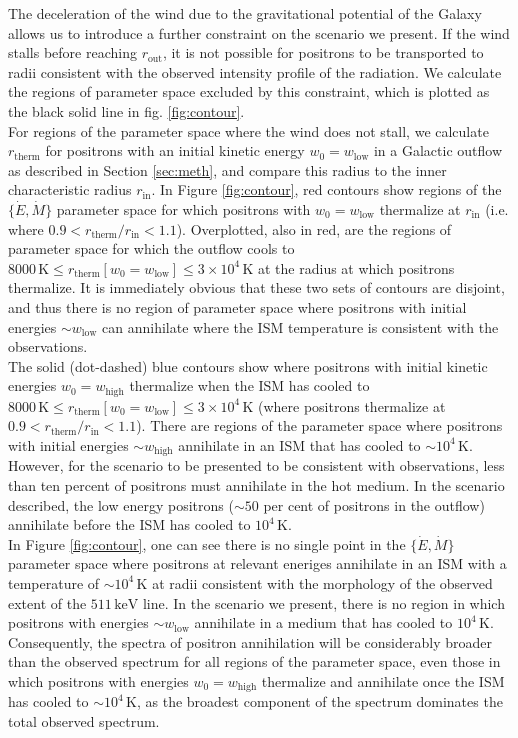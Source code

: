 \documentclass[a4paper,fleqn,usenatbib]{mnras}
\begin{document}
The deceleration of the wind due to the gravitational potential of the Galaxy allows us to introduce a further constraint on the scenario we present. If the wind stalls before reaching $r_\mathrm{out}$, it is not possible for positrons to be transported to radii consistent with the observed intensity profile of the radiation. We calculate the regions of parameter space excluded by this constraint, which is plotted as the black solid line in fig. \ref{fig:contour}.\\
For regions of the parameter space where the wind does not stall, we calculate $r_\mathrm{therm}$ for positrons with an initial kinetic energy $w_0 = w_\mathrm{low}$ in a Galactic outflow as described in Section \ref{sec:meth}, and compare this radius to the inner characteristic radius $r_\mathrm{in}$. In Figure \ref{fig:contour}, red contours show regions of the $\{\dot{E}, \dot{M}\}$ parameter space for which positrons with $w_0 = w_\mathrm{low}$ thermalize at $r_\mathrm{in}$ (i.e. where $0.9<r_\mathrm{therm}/r_\mathrm{in}<1.1$). Overplotted, also in red, are the regions of parameter space for which the outflow cools to $8000\,\mathrm{K}\leq r_\mathrm{therm}[w_0 = w_\mathrm{low}]\leq 3\times10^4\,\mathrm{K}$ at the radius at which positrons thermalize. It is immediately obvious that these two sets of contours are disjoint, and thus there is no region of parameter space where positrons with initial energies $\sim w_\mathrm{low}$ can annihilate where the ISM temperature is consistent with the observations.\\
The solid (dot-dashed) blue contours show where positrons with initial kinetic energies $w_0 = w_\mathrm{high}$ thermalize when the ISM has cooled to $8000\,\mathrm{K}\leq r_\mathrm{therm}[w_0 = w_\mathrm{low}] \leq 3\times10^4\,\mathrm{K}$ (where positrons thermalize at $0.9<r_\mathrm{therm}/r_\mathrm{in}<1.1$). There are regions of the parameter space where positrons with initial energies $\sim w_\mathrm{high}$ annihilate in an ISM that has cooled to $\sim 10^4\,\mathrm{K}$. However, for the scenario to be presented to be consistent with observations, less than ten percent of positrons must annihilate in the hot medium. In the scenario described, the low energy positrons ($\sim50$ per cent of positrons in the outflow) annihilate before the ISM has cooled to $10^4\,\mathrm{K}$.\\
In Figure \ref{fig:contour}, one can see there is no single point in the $\{\dot{E}, \dot{M}\}$ parameter space where positrons at relevant eneriges annihilate in an ISM with a temperature of $\sim 10^4\,\mathrm{K}$ at radii consistent with the morphology of the observed extent of the $511\,\mathrm{keV}$ line. In the scenario we present, there is no region in which positrons with energies $\sim w_\mathrm{low}$ annihilate in a medium that has cooled to $10^4\,\mathrm{K}$. Consequently, the spectra of positron annihilation will be considerably broader than the observed spectrum \citep{Guessoum05} for all regions of the parameter space, even those in which positrons with energies $w_0 = w_\mathrm{high}$ thermalize and annihilate once the ISM has cooled to $\sim 10^4\,\mathrm{K}$, as the broadest component of the spectrum dominates the total observed spectrum.\\
\end{document}
